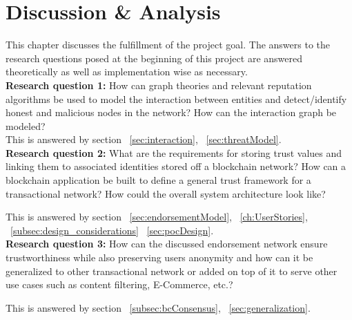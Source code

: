 \chapter{Discussion \& Analysis} \label{ch:discussion}
This chapter discusses the fulfillment of the project goal. The answers to the
research questions posed at the beginning of this project are answered
theoretically as well as implementation wise as necessary.\\

\textbf{Research question 1: }How can graph theories and relevant reputation
algorithms be used to model the interaction between entities and
detect/identify honest and malicious nodes in the network? How can the
interaction graph be modeled? \\

This is answered by section ~\ref{sec:interaction},
~\ref{sec:threatModel}.\\


\textbf{Research question 2: }What are the requirements for storing trust values
and linking them to associated identities stored off a blockchain network? How
can a blockchain application be built to define a general trust framework for a
transactional network? How could the overall system architecture look like?

This is answered by section ~\ref{sec:endorsementModel},
~\ref{ch:UserStories}, ~\ref{subsec:design_considerations}
~\ref{sec:pocDesign}. \\

\textbf{Research question 3: }How can the discussed endorsement network ensure
trustworthiness while also preserving users anonymity and how can it be
generalized to other transactional network or added on top of it to serve other
use cases such as content filtering, E-Commerce, etc.?

This is answered by section ~\ref{subsec:bcConsensus},
~\ref{sec:generalization}.\\

